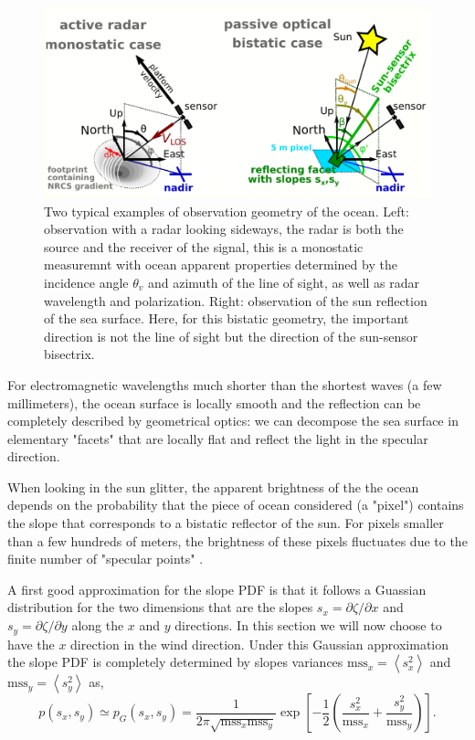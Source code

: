 \begin{figure}[htb]
\centerline{\includegraphics[width=0.6\linewidth]{FIGS_CH_REMOTE/geometry_optical.pdf}}
\caption[]
{Two typical examples of observation geometry of the ocean. Left: observation with a radar looking sideways, the radar is both the source and the receiver of the signal, this is a monostatic measuremnt with ocean apparent properties determined by the incidence angle $\theta_v$ and azimuth of the line of sight, as well as radar wavelength and polarization. Right: observation of the sun reflection of the sea surface. Here, for this bistatic geometry, the important direction is not the line of sight but the direction of the sun-sensor bisectrix. \label{fig:remote_sensing_geometry}}
\end{figure}
For electromagnetic wavelengths much shorter than the shortest waves (a few millimeters), the ocean surface is locally smooth and the reflection can be completely described by geometrical optics: we can decompose the sea surface in elementary "facets" that are locally flat and reflect the light in the specular direction. 


When looking in the sun glitter,  the apparent brightness of the the ocean depends on the probability that the piece of ocean considered (a "pixel") contains the slope that corresponds to a bistatic reflector of the sun. For pixels smaller than a few hundreds of meters, the brightness of these pixels fluctuates due to the finite number of "specular points" \citep{Longuet-Higgins1960c}. 

A first good approximation for the slope PDF is that it follows a Guassian distribution for the two dimensions that are the slopes $s_x=\partial \zeta / \partial x$ and $s_y=\partial \zeta / \partial y$ along the $x$ and $y$ directions. In this section we will now choose to have the $x$ direction  in the wind direction. Under this Gaussian approximation the slope PDF is completely determined by slopes variances $\mathrm{mss}_x=\left< s_x^2 \right>$ and $\mathrm{mss}_y=\left< s_y^2 \right>$ as, 
\begin{equation}
p(s_x,s_y) \simeq p_G(s_x,s_y)=\frac{1}{2 \pi \sqrt{\mathrm{mss}_x \mathrm{mss}_y} } \exp \left[-\frac{1}{2} \left(\frac{s_x^2}{\mathrm{mss}_x} + \frac{s_y^2}{\mathrm{mss}_y}\right)\right].
\end{equation}


